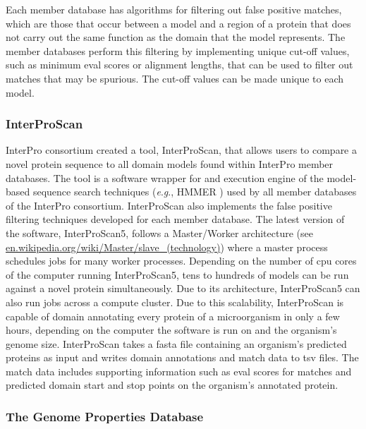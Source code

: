 Each member database has algorithms for filtering out false positive matches, 
which are those that occur between a model and a region of a protein that does 
not carry out the same function as the domain that the model represents. The 
member databases perform this filtering by implementing unique cut-off values, 
such as minimum \gls{eval} scores or alignment lengths, that can be used to 
filter out matches that may be spurious. The cut-off values can be made unique 
to each model. 

\subsubsection{InterProScan}

InterPro consortium created a tool, InterProScan, that allows users to compare a 
novel protein sequence to all domain models found within InterPro member 
databases. The tool is a software wrapper for and execution engine of the 
model-based sequence search techniques (\textit{e}.\textit{g}., HMMER 
\cite{eddy2011accelerated}) used by all member databases of the InterPro 
consortium. InterProScan also implements the false positive filtering techniques 
developed for each member database. The latest version of the software, 
InterProScan5, follows a Master/Worker architecture (see 
\href{http://en.wikipedia.org/wiki/Master/slave_(technology)}{en.wikipedia.org/wiki/Master/slave\_(technology)}) 
where a master process schedules jobs for many worker processes. Depending on 
the number of \gls{cpu} cores of the computer running InterProScan5, tens to 
hundreds of models can be run against a novel protein simultaneously. Due to its 
architecture, InterProScan5 can also run jobs across a compute cluster. Due 
to this scalability, InterProScan is capable of domain annotating every protein 
of a microorganism in only a few hours, depending on the computer the software 
is run on and the organism's genome size. InterProScan takes a \gls{fasta} file 
\cite{pearson19905} containing an organism's predicted proteins as input and 
writes domain annotations and match data to \gls{tsv} files. The match data 
includes supporting information such as \gls{eval} scores for matches and 
predicted domain start and stop points on the organism's annotated protein.

\subsubsection{The Genome Properties Database} 

